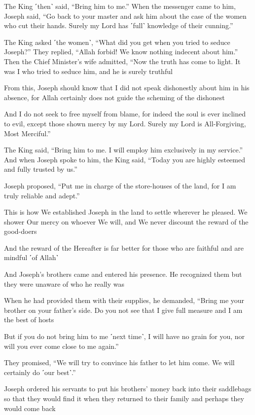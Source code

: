 The King ˹then˺ said, “Bring him to me.” When the messenger came to him, Joseph said, “Go back to your master and ask him about the case of the women who cut their hands. Surely my Lord has ˹full˺ knowledge of their cunning.”

The King asked ˹the women˺, “What did you get when you tried to seduce Joseph?” They replied, “Allah forbid! We know nothing indecent about him.” Then the Chief Minister’s wife admitted, “Now the truth has come to light. It was I who tried to seduce him, and he is surely truthful

From this, Joseph should know that I did not speak dishonestly about him in his absence, for Allah certainly does not guide the scheming of the dishonest

And I do not seek to free myself from blame, for indeed the soul is ever inclined to evil, except those shown mercy by my Lord. Surely my Lord is All-Forgiving, Most Merciful.”

The King said, “Bring him to me. I will employ him exclusively in my service.” And when Joseph spoke to him, the King said, “Today you are highly esteemed and fully trusted by us.”

Joseph proposed, “Put me in charge of the store-houses of the land, for I am truly reliable and adept.”

This is how We established Joseph in the land to settle wherever he pleased. We shower Our mercy on whoever We will, and We never discount the reward of the good-doers

And the reward of the Hereafter is far better for those who are faithful and are mindful ˹of Allah˺

And Joseph’s brothers came and entered his presence. He recognized them but they were unaware of who he really was

When he had provided them with their supplies, he demanded, “Bring me your brother on your father’s side. Do you not see that I give full measure and I am the best of hosts

But if you do not bring him to me ˹next time˺, I will have no grain for you, nor will you ever come close to me again.”

They promised, “We will try to convince his father to let him come. We will certainly do ˹our best˺.”

Joseph ordered his servants to put his brothers’ money back into their saddlebags so that they would find it when they returned to their family and perhaps they would come back

